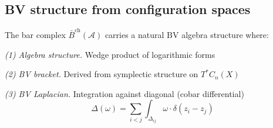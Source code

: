 \subsection{BV structure from configuration spaces}

\begin{theorem}
\label{thm:config-space-bv}
The bar complex $\bar{B}^{\mathrm{ch}}(\mathcal{A})$ carries a natural BV algebra structure where:

\emph{(1) Algebra structure.} Wedge product of logarithmic forms

\emph{(2) BV bracket.} Derived from symplectic structure on $T^*C_n(X)$

\emph{(3) BV Laplacian.} Integration against diagonal (cobar differential)
\[\Delta(\omega) = \sum_{i < j} \int_{\Delta_{ij}} \omega \cdot \delta(z_i - z_j)\]
\end{theorem}

